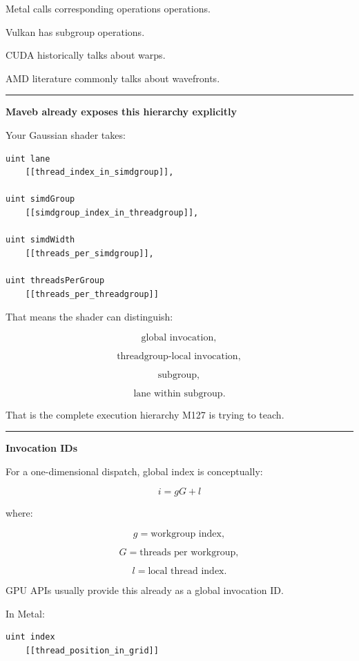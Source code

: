 Metal calls corresponding operations  operations.

Vulkan has subgroup operations.

CUDA historically talks about warps.

AMD literature commonly talks about wavefronts.

\begin{center}\rule{0.5\linewidth}{0.5pt}\end{center}

\textbf{Maveb already exposes this hierarchy explicitly}

Your Gaussian shader takes:

\protect{}\label{z8wxwy}%
\begin{verbatim}
uint lane
    [[thread_index_in_simdgroup]],

uint simdGroup
    [[simdgroup_index_in_threadgroup]],

uint simdWidth
    [[threads_per_simdgroup]],

uint threadsPerGroup
    [[threads_per_threadgroup]]
\end{verbatim}

That means the shader can distinguish:

\[
\text{global invocation},
\]

\[
\text{threadgroup-local invocation},
\]

\[
\text{subgroup},
\]

\[
\text{lane within subgroup}.
\]

That is the complete execution hierarchy M127 is trying to teach.

\begin{center}\rule{0.5\linewidth}{0.5pt}\end{center}

\textbf{Invocation IDs}

For a one-dimensional dispatch, global index is conceptually:

\[
\boxed{
i=
gG+l
}
\]

where:

\[
g=\text{workgroup index},
\]

\[
G=\text{threads per workgroup},
\]

\[
l=\text{local thread index}.
\]

GPU APIs usually provide this already as a global invocation ID.

In Metal:

\protect{}\label{0x8pi8}%
\begin{verbatim}
uint index
    [[thread_position_in_grid]]
\end{verbatim}

